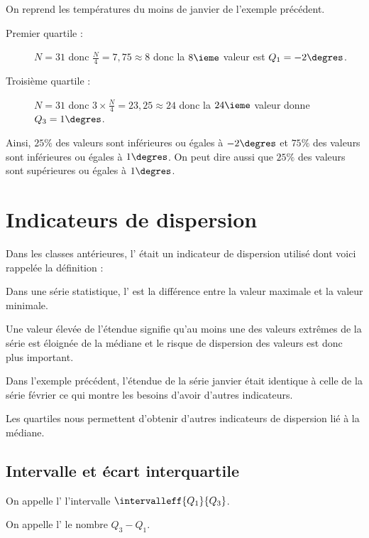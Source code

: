 \documentclass[10pt,openright,twoside,french]{book}
\begin{document}
\begin{Exemple}
    On reprend les températures du moins de janvier de l'exemple précédent.
    \begin{description}
        \item[Premier quartile :] $N = 31$ donc $\frac N 4 = 7,75 \approx 8$ donc la $8\ieme$ valeur est $Q_1 = -2\degres$.
        \item[Troisième quartile :] $N = 31$ donc $3\times\frac N 4 = 23,25 \approx 24$ donc la $24\ieme$ valeur donne $Q_3 = 1\degres$.
    \end{description}
    Ainsi, $25\%$ des valeurs sont inférieures ou égales à $-2\degres$ et $75\%$ des valeurs sont inférieures ou égales à $1\degres$. On peut dire aussi que $25\%$ des valeurs sont supérieures ou égales à $1\degres$.
\end{Exemple}

\section{Indicateurs de dispersion}

Dans les classes antérieures, l' était un indicateur de dispersion utilisé dont voici rappelée la définition :

\begin{Defi}
    Dans une série statistique, l' est la différence entre la valeur maximale et la valeur minimale.
\end{Defi}

\begin{Rmq}
    Une valeur élevée de l'étendue signifie qu'au moins une des valeurs extrêmes de la série est éloignée de la médiane et le risque de dispersion des valeurs est donc plus important.\par
    Dans l'exemple précédent, l'étendue de la série \textnormal{janvier} était identique à celle de la série \textnormal{février} ce qui montre les besoins d'avoir d'autres indicateurs.\par
    Les quartiles nous permettent d'obtenir d'autres indicateurs de dispersion lié à la médiane.
\end{Rmq}

\subsection{Intervalle et écart interquartile}

\begin{Defi}
    On appelle l' l'intervalle $\intervalleff{Q_1}{Q_3}$.\par
    On appelle l' le nombre $Q_3 - Q_1$.
\end{Defi}
\end{document}
